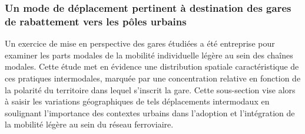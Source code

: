 \begin{refsegment}
\subsubsection*{Un mode de déplacement pertinent à destination des gares de rabattement vers les pôles urbains
    \label{chap4:part-modale-gares-centre-periurbain}
    }

Un exercice de mise en perspective des gares étudiées a été entreprise pour examiner les parts modales de la mobilité individuelle légère au sein des chaînes modales. Cette étude met en évidence une distribution spatiale caractéristique de ces pratiques intermodales, marquée par une concentration relative en fonction de la polarité du territoire dans lequel s'inscrit la gare. Cette sous-section vise alors à saisir les variations géographiques de tels déplacements intermodaux en soulignant l'importance des contextes urbains dans l'adoption et l'intégration de la mobilité légère au sein du réseau ferroviaire.%



\end{refsegment}
